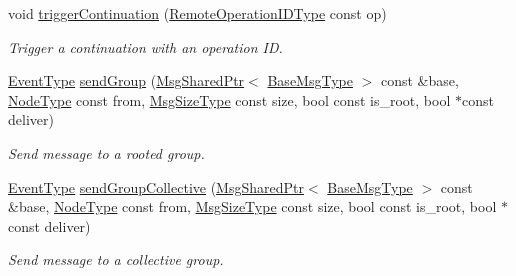 \begin{DoxyCompactItemize}
void \hyperlink{structvt_1_1group_1_1_group_manager_aaa86d701377ece72b51bc7a2d0a945b0}{trigger\+Continuation} (\hyperlink{namespacevt_1_1group_a73f2624ddeb535b39a08b6524f26b244}{Remote\+Operation\+I\+D\+Type} const op)
\begin{DoxyCompactList}\small\item\em Trigger a continuation with an operation ID. \end{DoxyCompactList}\item 
\hyperlink{namespacevt_a009267401def7ae8bf201892222d060f}{Event\+Type} \hyperlink{structvt_1_1group_1_1_group_manager_a7c958e6ea3f6b0a8eeed2e16f240461a}{send\+Group} (\hyperlink{namespacevt_ab2b3d506ec8e8d1540aede826d84a239}{Msg\+Shared\+Ptr}$<$ \hyperlink{namespacevt_a44d0d4e144748f2b19a1cfd962f50338}{Base\+Msg\+Type} $>$ const \&base, \hyperlink{namespacevt_a866da9d0efc19c0a1ce79e9e492f47e2}{Node\+Type} const from, \hyperlink{namespacevt_abfa009d900299ac1df967b40ea8f2c8a}{Msg\+Size\+Type} const size, bool const is\+\_\+root, bool $\ast$const deliver)
\begin{DoxyCompactList}\small\item\em Send message to a rooted group. \end{DoxyCompactList}\item 
\hyperlink{namespacevt_a009267401def7ae8bf201892222d060f}{Event\+Type} \hyperlink{structvt_1_1group_1_1_group_manager_a6a3d31f06d32a07d575ebbe16e9c0d07}{send\+Group\+Collective} (\hyperlink{namespacevt_ab2b3d506ec8e8d1540aede826d84a239}{Msg\+Shared\+Ptr}$<$ \hyperlink{namespacevt_a44d0d4e144748f2b19a1cfd962f50338}{Base\+Msg\+Type} $>$ const \&base, \hyperlink{namespacevt_a866da9d0efc19c0a1ce79e9e492f47e2}{Node\+Type} const from, \hyperlink{namespacevt_abfa009d900299ac1df967b40ea8f2c8a}{Msg\+Size\+Type} const size, bool const is\+\_\+root, bool $\ast$const deliver)
\begin{DoxyCompactList}\small\item\em Send message to a collective group. \end{DoxyCompactList}\end{DoxyCompactItemize}
